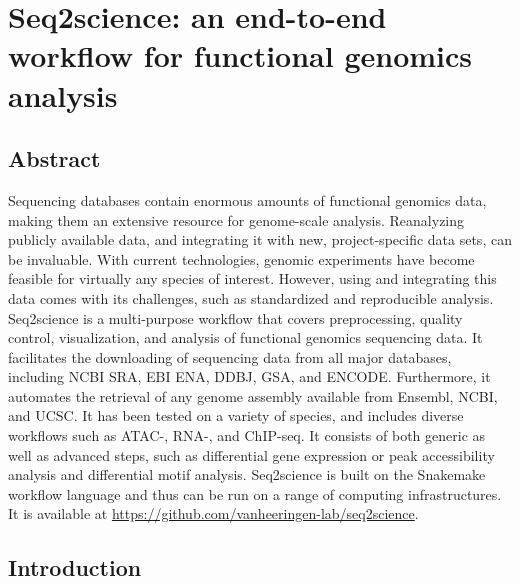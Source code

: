 \chapter{Seq2science: an end-to-end workflow for functional genomics analysis}\thumbforchapter
{}
\newpage

\section{Abstract}

Sequencing databases contain enormous amounts of functional genomics data, making them an extensive resource for genome-scale analysis. Reanalyzing publicly available data, and integrating it with new, project-specific data sets, can be invaluable. With current technologies, genomic experiments have become feasible for virtually any species of interest. However, using and integrating this data comes with its challenges, such as standardized and reproducible analysis. Seq2science is a multi-purpose workflow that covers preprocessing, quality control, visualization, and analysis of functional genomics sequencing data. It facilitates the downloading of sequencing data from all major databases, including NCBI SRA, EBI ENA, DDBJ, GSA, and ENCODE. Furthermore, it automates the retrieval of any genome assembly available from Ensembl, NCBI, and UCSC. It has been tested on a variety of species, and includes diverse workflows such as ATAC-, RNA-, and ChIP-seq. It consists of both generic as well as advanced steps, such as differential gene expression or peak accessibility analysis and differential motif analysis. Seq2science is built on the Snakemake workflow language and thus can be run on a range of computing infrastructures. It is available at \url{https://github.com/vanheeringen-lab/seq2science}.

\section{Introduction}

